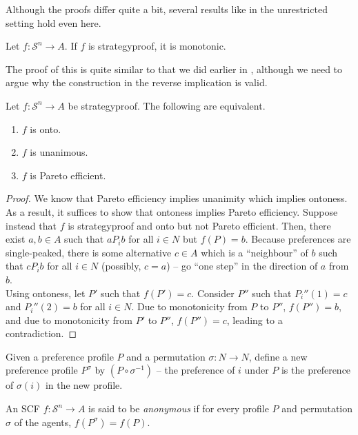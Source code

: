 		Although the proofs differ quite a bit, several results like in the unrestricted setting hold even here.

		\begin{ftheo}
			Let $f : \mathcal{S}^n \to A$. If $f$ is strategyproof, it is monotonic.
		\end{ftheo}
		The proof of this is quite similar to that we did earlier in , although we need to argue why the construction in the reverse implication is valid.

		\begin{ftheo}
			\label{theo: single-peaked equivalence}
			Let $f : \mathcal{S}^n \to A$ be strategyproof. The following are equivalent.
			\begin{enumerate}
				\item $f$ is onto.
				\item $f$ is unanimous.
				\item $f$ is Pareto efficient.
			\end{enumerate}
		\end{ftheo}

		\begin{proof}
 			We know that Pareto efficiency implies unanimity which implies ontoness. As a result, it suffices to show that ontoness implies Pareto efficiency. Suppose instead that $f$ is strategyproof and onto but not Pareto efficient. Then, there exist $a,b \in A$ such that $a P_i b$ for all $i \in N$ but $f(P) = b$. Because preferences are single-peaked, there is some alternative $c \in A$ which is a ``neighbour'' of $b$ such that $c P_i b$ for all $i \in N$ (possibly, $c = a$) -- go ``one step'' in the direction of $a$ from $b$.\\
			Using ontoness, let $P'$ such that $f(P') = c$. Consider $P''$ such that $P_i''(1) = c$ and $P_i''(2) = b$ for all $i \in N$. Due to monotonicity from $P$ to $P''$, $f(P'') = b$, and due to monotonicity from $P'$ to $P''$, $f(P'') = c$, leading to a contradiction.
		\end{proof}

		\begin{fdef}
			Given a preference profile $P$ and a permutation $\sigma : N \to N$, define a new preference profile $P^\sigma$ by $(P \circ \sigma^{-1})$ -- the preference of $i$ under $P$ is the preference of $\sigma(i)$ in the new profile.
		\end{fdef}

		\begin{fdef}[Anonymity]
			An SCF $f : \mathcal{S}^n \to A$ is said to be \emph{anonymous} if for every profile $P$ and permutation $\sigma$ of the agents, $f(P^\sigma) = f(P)$.
		\end{fdef}

